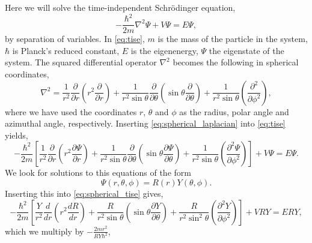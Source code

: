 Here we will solve the time-independent Schrödinger equation,
\begin{equation}
    \label{eq:tise}
    -\frac{\hbar^2}{2m}\nabla^2\Psi + V\Psi = E\Psi,
\end{equation}
by separation of variables. In \autoref{eq:tise}, $m$ is the mass of the 
particle in the system, $\hbar$ is Planck's reduced constant, $E$ is the eigenenergy,
$\Psi$ the eigenstate of the system. The squared differential operator $\nabla^2$
becomes the following in spherical coordinates,
\begin{equation}
    \label{eq:spherical_laplacian}
    \nabla^2 = 
        \frac{1}{r^2} \frac{\partial}{\partial r} 
            \left(r^2 \frac{\partial}{\partial r}\right)
        + 
        \frac{1}{r^2\sin\theta} \frac{\partial}{\partial \theta}
            \left(\sin\theta \frac{\partial}{\partial \theta} \right)
        +
        \frac{1}{r^2\sin\theta}
            \left(\frac{\partial^2}{\partial\phi^2}\right),
\end{equation}
where we have used the coordinates $r$, $\theta$ and $\phi$ as the radius,
polar angle and azimuthal angle, respectively. Inserting
\autoref{eq:spherical_laplacian} into \autoref{eq:tise} yields,
\begin{equation}
    \label{eq:spherical_tise}
    -\frac{\hbar^2}{2m}
    \left[
        \frac{1}{r^2}\frac{\partial}{\partial r} 
            \left(r^2 \frac{\partial \Psi}{\partial r} \right)
        +
        \frac{1}{r^2\sin\theta} \frac{\partial}{\partial\theta}
            \left(\sin\theta \frac{\partial \Psi}{\partial \theta} \right)
        +
        \frac{1}{r^2\sin\theta}
            \left(\frac{\partial^2 \Psi}{\partial \phi^2} \right)
    \right]
    +
    V \Psi
    =
    E \Psi.
\end{equation}
We look for solutions to this equations of the form 
\begin{equation}
    \Psi(r,\theta,\phi) = R(r) Y(\theta, \phi).
\end{equation}
Inserting this into \autoref{eq:spherical_tise} gives,
\begin{equation}
   -\frac{\hbar^2}{2m}
   \left[
        \frac{Y}{r^2} \frac{d}{dr}
            \left(r^2\frac{dR}{dr} \right)
        +
        \frac{R}{r^2\sin\theta}
            \left(\sin\theta \frac{\partial Y}{\partial\theta} \right)
        +
        \frac{R}{r^2\sin^2\theta}
            \left(\frac{\partial^2Y}{\partial\phi^2} \right)
   \right] 
    +
    VRY
    =
    ERY,
\end{equation}
which we multiply by $-\frac{2mr^2}{RY\hbar^2}$,
